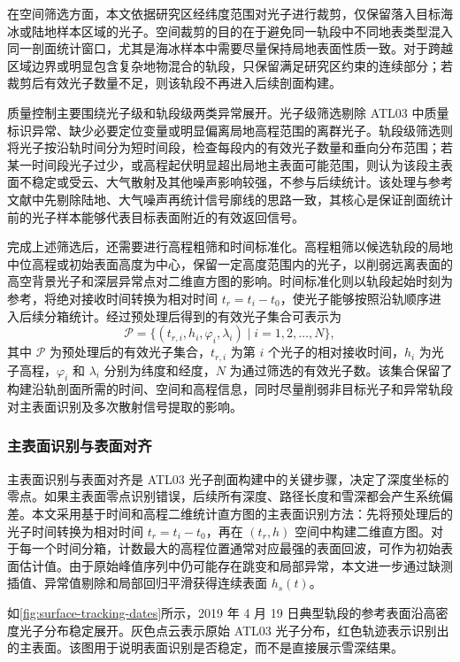 在空间筛选方面，本文依据研究区经纬度范围对光子进行裁剪，仅保留落入目标海冰或陆地样本区域的光子。空间裁剪的目的在于避免同一轨段中不同地表类型混入同一剖面统计窗口，尤其是海冰样本中需要尽量保持局地表面性质一致。对于跨越区域边界或明显包含复杂地物混合的轨段，只保留满足研究区约束的连续部分；若裁剪后有效光子数量不足，则该轨段不再进入后续剖面构建。

质量控制主要围绕光子级和轨段级两类异常展开。光子级筛选剔除 ATL03 中质量标识异常、缺少必要定位变量或明显偏离局地高程范围的离群光子。轨段级筛选则将光子按沿轨时间分为短时间段，检查每段内的有效光子数量和垂向分布范围；若某一时间段光子过少，或高程起伏明显超出局地主表面可能范围，则认为该段主表面不稳定或受云、大气散射及其他噪声影响较强，不参与后续统计。该处理与参考文献中先剔除陆地、大气噪声再统计信号廓线的思路一致，其核心是保证剖面统计前的光子样本能够代表目标表面附近的有效返回信号。

完成上述筛选后，还需要进行高程粗筛和时间标准化。高程粗筛以候选轨段的局地中位高程或初始表面高度为中心，保留一定高度范围内的光子，以削弱远离表面的高空背景光子和深层异常点对二维直方图的影响。时间标准化则以轨段起始时刻为参考，将绝对接收时间转换为相对时间 \(t_r=t_i-t_0\)，使光子能够按照沿轨顺序进入后续分箱统计。经过预处理后得到的有效光子集合可表示为
\begin{equation}
    \mathcal{P}=\{(t_{r,i},h_i,\varphi_i,\lambda_i)\mid i=1,2,\ldots,N\},
\end{equation}
其中 \(\mathcal{P}\) 为预处理后的有效光子集合，\(t_{r,i}\) 为第 \(i\) 个光子的相对接收时间，\(h_i\) 为光子高程，\(\varphi_i\) 和 \(\lambda_i\) 分别为纬度和经度，\(N\) 为通过筛选的有效光子数。该集合保留了构建沿轨剖面所需的时间、空间和高程信息，同时尽量削弱非目标光子和异常轨段对主表面识别及多次散射信号提取的影响。

\subsubsection{主表面识别与表面对齐}
主表面识别与表面对齐是 ATL03 光子剖面构建中的关键步骤，决定了深度坐标的零点。如果主表面零点识别错误，后续所有深度、路径长度和雪深都会产生系统偏差。本文采用基于时间和高程二维统计直方图的主表面识别方法：先将预处理后的光子时间转换为相对时间 \(t_r=t_i-t_0\)，再在 \((t_r,h)\) 空间中构建二维直方图。对于每一个时间分箱，计数最大的高程位置通常对应最强的表面回波，可作为初始表面估计值。由于原始峰值序列中仍可能存在跳变和局部异常，本文进一步通过缺测插值、异常值剔除和局部回归平滑获得连续表面 \(h_s(t)\)。

如\autoref{fig:surface-tracking-dates}所示，2019 年 4 月 19 日典型轨段的参考表面沿高密度光子分布稳定展开。灰色点云表示原始 ATL03 光子分布，红色轨迹表示识别出的主表面。该图用于说明表面识别是否稳定，而不是直接展示雪深结果。


